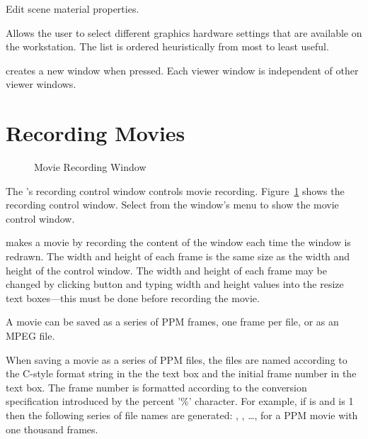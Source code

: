 \begin{description}
\begin{description}
     Edit scene material properties.
  \end{description}

   Allows the user to select different
  graphics hardware settings that are available on the workstation.
  The list is ordered heuristically from most to least useful.

    creates a new \viewer{}
  window when pressed.  Each viewer window is independent of other
  viewer windows.
\end{description}

\section{Recording Movies}
\label{sec:recordmovies} 

\begin{figure}[htb]
  \begin{makeimage}
  \end{makeimage}
  \recordmoviewin
  \caption{\label{fig:recordmoviewin} Movie Recording Window}
\end{figure}

The \viewer{}'s recording control window controls movie recording.
Figure~\ref{fig:recordmoviewin} shows the recording control window.
Select  from the \viewer{} window's
 menu to show the movie control window.

\sr{} makes a movie by recording the content of the \viewer{} window
each time the \viewer{} window is redrawn.  The width and height of
each frame is the same size as the width and height of the \viewer{}
control window.  The width and height of each frame may be changed by
clicking button  and typing width and height values
into the resize text boxes---this must be done before recording the
movie.

A movie can be saved as a series of PPM frames, one frame per
file,  or as an MPEG file.

When saving a movie as a series of PPM files, the files are named
according to the C-style format string in the the 
text box and the initial frame number in the  text
box.  The frame number is formatted according to the conversion
specification introduced by the percent '\%' character.  For example,
if  is  and  is 1
then the following series of file names are generated:
, , \ldots,
 for a PPM movie with one thousand frames.

